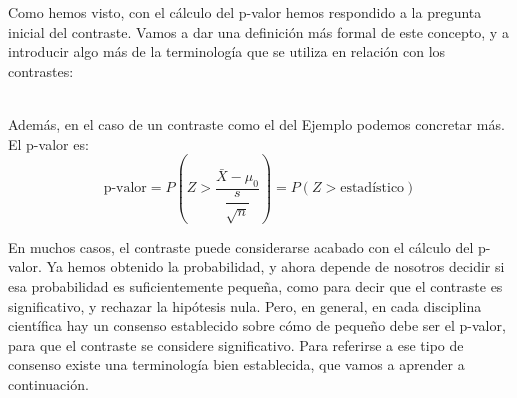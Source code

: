 Como hemos visto, con el cálculo del p-valor hemos respondido a la pregunta inicial del contraste. Vamos a dar una definición más formal de este concepto, y a introducir algo más de la terminología que se utiliza en relación con los contrastes:
    \begin{center}
    \end{center}
\quad\\[5mm]

Además, en el caso de un contraste como el del Ejemplo podemos concretar más. El p-valor es:
\begin{equation}\label{cap07:ecu:pValorMediaZColaDerecha}
\mbox{p-valor}=P\left(Z > \dfrac{\bar X-\mu_0}{\dfrac{s}{\sqrt{n}}}\right)=
P\left(Z > \mbox{estadístico}\right)
\end{equation}


En muchos casos, el contraste puede considerarse acabado con el cálculo del p-valor. Ya hemos obtenido la probabilidad, y ahora depende de nosotros decidir si esa probabilidad es suficientemente pequeña, como para decir que el contraste es significativo, y rechazar la hipótesis nula. Pero, en general, en cada disciplina científica hay un consenso establecido sobre cómo de pequeño debe ser el p-valor, para que el contraste se considere significativo. Para referirse a ese tipo de consenso existe una terminología bien establecida, que vamos a aprender a continuación.\\

